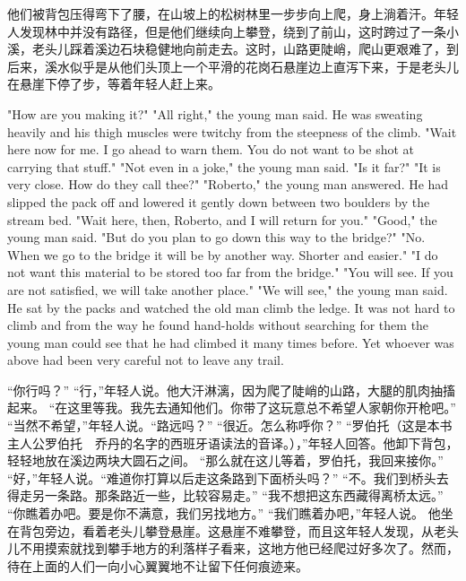 {	他们被背包压得弯下了腰，在山坡上的松树林里一步步向上爬，身上淌着汗。年轻人发现林中并没有路径，但是他们继续向上攀登，绕到了前山，这时跨过了一条小溪，老头儿踩着溪边石块稳健地向前走去。这时，山路更陡峭，爬山更艰难了，到后来，溪水似乎是从他们头顶上一个平滑的花岗石悬崖边上直泻下来，于是老头儿在悬崖下停了步，等着年轻人赶上来。
	
	"How are you making it?" "All right," the young man said. He was sweating heavily and his thigh muscles were twitchy from the steepness of the climb. "Wait here now for me. I go ahead to warn them. You do not want to be shot at carrying that stuff." "Not even in a joke," the young man said. "Is it far?" "It is very close. How do they call thee?" "Roberto," the young man answered. He had slipped the pack off and lowered it gently down between two boulders by the stream bed. "Wait here, then, Roberto, and I will return for you." "Good," the young man said. "But do you plan to go down this way to the bridge?" "No. When we go to the bridge it will be by another way. Shorter and easier." "I do not want this material to be stored too far from the bridge." "You will see. If you are not satisfied, we will take another place." "We will see," the young man said. He sat by the packs and watched the old man climb the ledge. It was not hard to climb and from the way he found hand-holds without searching for them the young man could see that he had climbed it many times before. Yet whoever was above had been very careful not to leave any trail.
	
	“你行吗？” “行，”年轻人说。他大汗淋漓，因为爬了陡峭的山路，大腿的肌肉抽搐起来。 “在这里等我。我先去通知他们。你带了这玩意总不希望人家朝你开枪吧。” “当然不希望，”年轻人说。“路远吗？” “很近。怎么称呼你？” “罗伯托（这是本书主人公罗伯托　乔丹的名字的西班牙语读法的音译。），”年轻人回答。他卸下背包，轻轻地放在溪边两块大圆石之间。 “那么就在这儿等着，罗伯托，我回来接你。” “好，”年轻人说。“难道你打算以后走这条路到下面桥头吗？” “不。我们到桥头去得走另一条路。那条路近一些，比较容易走。” “我不想把这东西藏得离桥太远。” “你瞧着办吧。要是你不满意，我们另找地方。” “我们瞧着办吧，”年轻人说。	他坐在背包旁边，看着老头儿攀登悬崖。这悬崖不难攀登，而且这年轻人发现，从老头儿不用摸索就找到攀手地方的利落样子看来，这地方他已经爬过好多次了。然而，待在上面的人们一向小心翼翼地不让留下任何痕迹来。}